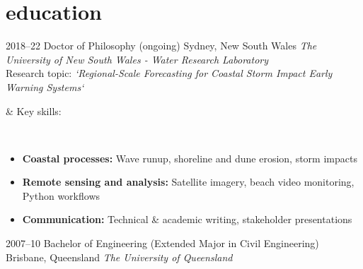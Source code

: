 
\section{education}
\begin{entrylist}
\entry%
{2018--22}
{Doctor of Philosophy {\normalfont (ongoing)}}%
{Sydney, New South Wales}
{\emph{The University of New South Wales - Water Research Laboratory} \\
Research topic: \textit{`Regional-Scale Forecasting for Coastal Storm Impact Early Warning Systems`}}

& Key skills: \\  

\entrybulletsindented%
{}
{}
{}
{\vspace{-2em}\\
\begin{itemize}
\item \textbf{Coastal processes:} Wave runup, shoreline and dune erosion, storm impacts
\item \textbf{Remote sensing and analysis:} Satellite imagery, beach video monitoring, Python workflows
\item \textbf{Communication:} Technical \& academic writing, stakeholder presentations
\end{itemize}
}


\entry%
{2007--10}
{Bachelor of Engineering {\normalfont (Extended Major in Civil Engineering)}}%
{Brisbane, Queensland}
{\emph{The University of Queensland}
}
\end{entrylist}
